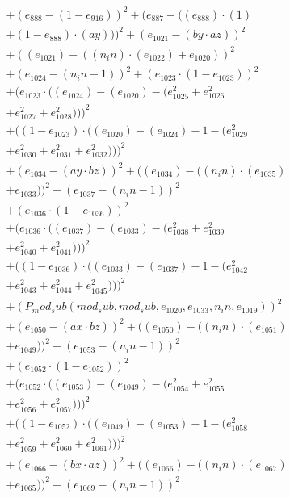 \documentclass[10pt, a4paper]{article}
\begin{document}
\begin{small}
\begin{align*}
& + (e_{888} - (1 - e_{916}))^{2} + (e_{887} - ((e_{888})  \cdot  (1) \\
& + (1 - e_{888})  \cdot  (ay)))^{2} + (e_{1021} - (by  \cdot  az))^{2} \\
& + ((e_{1021}) - ((n_in)  \cdot  (e_{1022}) + e_{1020}))^{2} \\
& + (e_{1024} - (n_in - 1))^{2} + (e_{1023}  \cdot  (1 - e_{1023}))^{2} \\
& + (e_{1023}  \cdot  ((e_{1024}) - (e_{1020}) - (e_{1025}^{2} + e_{1026}^{2} \\
& + e_{1027}^{2} + e_{1028}^{2})))^{2} \\
& + ((1 - e_{1023})  \cdot  ((e_{1020}) - (e_{1024}) - 1 - (e_{1029}^{2} \\
& + e_{1030}^{2} + e_{1031}^{2} + e_{1032}^{2})))^{2} \\
& + (e_{1034} - (ay  \cdot  bz))^{2} + ((e_{1034}) - ((n_in)  \cdot  (e_{1035}) \\
& + e_{1033}))^{2} + (e_{1037} - (n_in - 1))^{2} \\
& + (e_{1036}  \cdot  (1 - e_{1036}))^{2} \\
& + (e_{1036}  \cdot  ((e_{1037}) - (e_{1033}) - (e_{1038}^{2} + e_{1039}^{2} \\
& + e_{1040}^{2} + e_{1041}^{2})))^{2} \\
& + ((1 - e_{1036})  \cdot  ((e_{1033}) - (e_{1037}) - 1 - (e_{1042}^{2} \\
& + e_{1043}^{2} + e_{1044}^{2} + e_{1045}^{2})))^{2} \\
& + (P_mod_sub(mod_sub, mod_sub, e_{1020}, e_{1033}, n_in, e_{1019}))^{2} \\
& + (e_{1050} - (ax  \cdot  bz))^{2} + ((e_{1050}) - ((n_in)  \cdot  (e_{1051}) \\
& + e_{1049}))^{2} + (e_{1053} - (n_in - 1))^{2} \\
& + (e_{1052}  \cdot  (1 - e_{1052}))^{2} \\
& + (e_{1052}  \cdot  ((e_{1053}) - (e_{1049}) - (e_{1054}^{2} + e_{1055}^{2} \\
& + e_{1056}^{2} + e_{1057}^{2})))^{2} \\
& + ((1 - e_{1052})  \cdot  ((e_{1049}) - (e_{1053}) - 1 - (e_{1058}^{2} \\
& + e_{1059}^{2} + e_{1060}^{2} + e_{1061}^{2})))^{2} \\
& + (e_{1066} - (bx  \cdot  az))^{2} + ((e_{1066}) - ((n_in)  \cdot  (e_{1067}) \\
& + e_{1065}))^{2} + (e_{1069} - (n_in - 1))^{2} \\

\end{align*}
\end{small}
\end{document}
